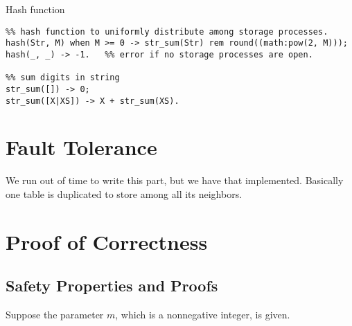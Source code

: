 \documentclass[11pt]{article}
\begin{document}
\begin{algorithm}
  \caption{Hash function}\label{hash}
  \begin{lstlisting}
%% hash function to uniformly distribute among storage processes.
hash(Str, M) when M >= 0 -> str_sum(Str) rem round((math:pow(2, M)));
hash(_, _) -> -1.   %% error if no storage processes are open.
      
%% sum digits in string
str_sum([]) -> 0;
str_sum([X|XS]) -> X + str_sum(XS).
  \end{lstlisting}
\end{algorithm}

\section{Fault Tolerance}
We run out of time to write this part, but we have that implemented. Basically one table is duplicated to store among all its neighbors.
\section{Proof of Correctness}


\subsection{Safety Properties and Proofs}
Suppose the parameter $m$, which is a nonnegative integer, is given.
\end{document}
